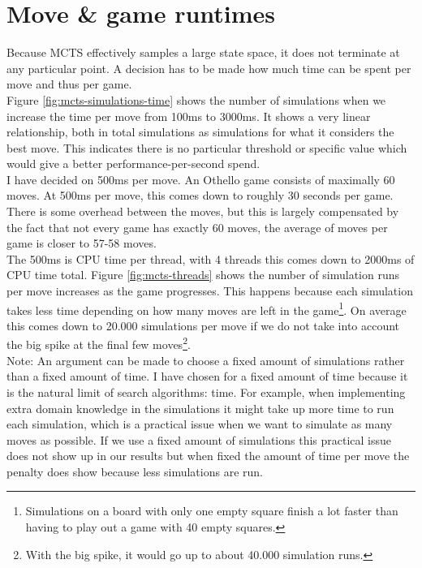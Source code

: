 \documentclass[
11pt, %
english, %
singlespacing, %
headsepline, %
]{MastersDoctoralThesis} %
\begin{document}
\section{Move \& game runtimes}
Because MCTS effectively samples a large state space, it does not terminate at any particular point. A decision has to be made how much time can be spent per move and thus per game.\\

Figure \ref{fig:mcts-simulations-time} shows the number of simulations when we increase the time per move from 100ms to 3000ms. It shows a very linear relationship, both in total simulations as simulations for what it considers the best move. This indicates there is no particular threshold or specific value which would give a better performance-per-second spend.\\

I have decided on 500ms per move. An Othello game consists of maximally 60 moves. At 500ms per move, this comes down to roughly 30 seconds per game. There is some overhead between the moves, but this is largely compensated by the fact that not every game has exactly 60 moves, the average of moves per game is closer to 57-58 moves.\\

The 500ms is CPU time per thread, with 4 threads this comes down to 2000ms of CPU time total. Figure \ref{fig:mcts-threads} shows the number of simulation runs per move increases as the game progresses. This happens because each simulation takes less time depending on how many moves are left in the game\footnote{Simulations on a board with only one empty square finish a lot faster than having to play out a game with 40 empty squares.}. On average this comes down to 20.000 simulations per move if we do not take into account the big spike at the final few moves\footnote{With the big spike, it would go up to about 40.000 simulation runs.}.\\

Note: An argument can be made to choose a fixed amount of simulations rather than a fixed amount of time. I have chosen for a fixed amount of time because it is the natural limit of search algorithms: time. For example, when implementing extra domain knowledge in the simulations it might take up more time to run each simulation, which is a practical issue when we want to simulate as many moves as possible. If we use a fixed amount of simulations this practical issue does not show up in our results but when fixed the amount of time per move the penalty does show because less simulations are run.
\end{document}
